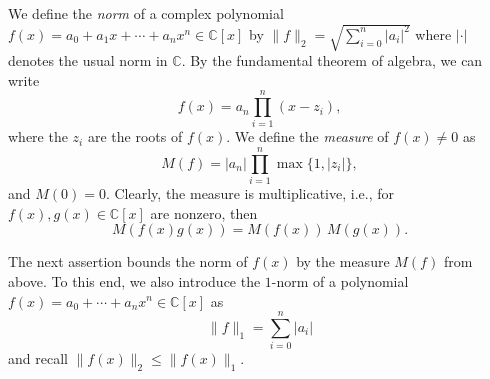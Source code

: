 We define the \emph{norm} of a complex polynomial  $f(x) = a_0+a_1x+ \cdots+a_nx^n ∈ ℂ[x]$ by  $\|f\|_2 = \sqrt{∑_{i=0}^n |a_i|^2}$ where $|⋅|$ denotes the usual norm in $ℂ$. By the fundamental theorem of algebra, we can write
\begin{displaymath}
f(x)  = a_n ∏_{i=1}^n (x-z_i),  
\end{displaymath}
where the $z_i$ are the roots of $f(x)$. We define the \emph{measure} of $f(x)≠0$ as
\begin{displaymath}
  M(f) = |a_n| ∏_{i=1}^n \max\{1,|z_i|\},
\end{displaymath}
and $M(0) = 0$. 
Clearly, the measure is multiplicative, i.e., for $f(x),g(x) ∈ℂ[x]$ are nonzero, then
\begin{displaymath}
  M(f(x)g(x)) = M(f(x)) \, M (g(x)). 
\end{displaymath}


The next assertion bounds the norm of $f(x)$ by the measure $M(f)$ from above. To this end, we also introduce the $1$-norm of a polynomial $f(x) = a_0+ \cdots+a_nx^n∈ ℂ[x]$ as
\begin{displaymath}
  \|f\|_1 = ∑_{i=0}^n |a_i| 
\end{displaymath}
and recall $\|f(x)\|_2 ≤ \|f(x)\|_1$. 

